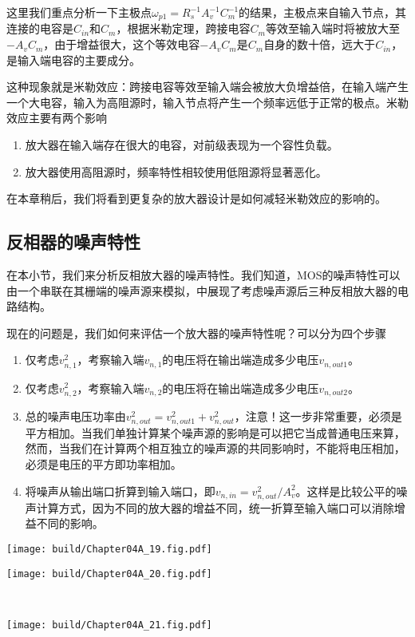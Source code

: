 这里我们重点分析一下主极点$\omega_{p1}=R_s^{-1}A_v^{-1}C_{m}^{-1}$的结果，主极点来自输入节点，其连接的电容是$C_{in}$和$C_m$，根据米勒定理，跨接电容$C_m$等效至输入端时将被放大至$-A_vC_m$，由于增益很大，这个等效电容$-A_vC_m$是$C_m$自身的数十倍，远大于$C_{in}$，是输入端电容的主要成分。

这种现象就是米勒效应：跨接电容等效至输入端会被放大负增益倍，在输入端产生一个大电容，输入为高阻源时，输入节点将产生一个频率远低于正常的极点。米勒效应主要有两个影响
\begin{enumerate}
    \item 放大器在输入端存在很大的电容，对前级表现为一个容性负载。
    \item 放大器使用高阻源时，频率特性相较使用低阻源将显著恶化。
\end{enumerate}
在本章稍后，我们将看到更复杂的放大器设计是如何减轻米勒效应的影响的。

\subsection{反相器的噪声特性}
在本小节，我们来分析反相放大器的噪声特性。我们知道，MOS的噪声特性可以由一个串联在其栅端的噪声源来模拟，中展现了考虑噪声源后三种反相放大器的电路结构。

现在的问题是，我们如何来评估一个放大器的噪声特性呢？可以分为四个步骤
\begin{enumerate}
    \item 仅考虑$v_{n,1}^2$，考察输入端$v_{n,1}$的电压将在输出端造成多少电压$v_{n,out1}$。
    \item 仅考虑$v_{n,2}^2$，考察输入端$v_{n,2}$的电压将在输出端造成多少电压$v_{n,out2}$。
    \item 总的噪声电压功率由$v_{n,out}^2=v_{n,out1}^2+v_{n,out}^2$，注意！这一步非常重要，必须是平方相加。当我们单独计算某个噪声源的影响是可以把它当成普通电压来算，然而，当我们在计算两个相互独立的噪声源的共同影响时，不能将电压相加，必须是电压的平方即功率相加。
    \item 将噪声从输出端口折算到输入端口，即$v_{n,in}=v_{n,out}^2/A_v^2$。这样是比较公平的噪声计算方式，因为不同的放大器的增益不同，统一折算至输入端口可以消除增益不同的影响。
\end{enumerate}

\begin{Figure}[反相放大器的噪声]
    \begin{FigureSub}
        \texttt{[image: build/Chapter04A\_19.fig.pdf]}
    \end{FigureSub}\qquad
    \begin{FigureSub}
        \texttt{[image: build/Chapter04A\_20.fig.pdf]}
    \end{FigureSub}\\ \vspace{0.1cm}
    \begin{FigureSub}
        \texttt{[image: build/Chapter04A\_21.fig.pdf]}
    \end{FigureSub}
\end{Figure}



